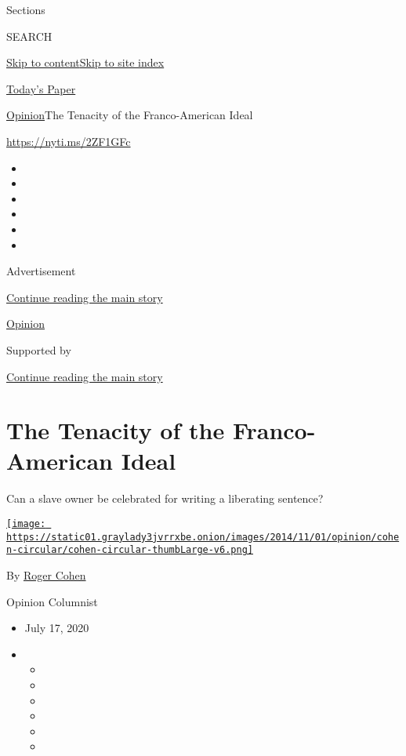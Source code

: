 Sections

SEARCH

\protect\hyperlink{site-content}{Skip to
content}\protect\hyperlink{site-index}{Skip to site index}

\href{https://myaccount.nytimes3xbfgragh.onion/auth/login?response_type=cookie\&client_id=vi}{}

\href{https://www.nytimes3xbfgragh.onion/section/todayspaper}{Today's
Paper}

\href{/section/opinion}{Opinion}\textbar{}The Tenacity of the
Franco-American Ideal

\url{https://nyti.ms/2ZF1GFc}

\begin{itemize}
\item
\item
\item
\item
\item
\item
\end{itemize}

Advertisement

\protect\hyperlink{after-top}{Continue reading the main story}

\href{/section/opinion}{Opinion}

Supported by

\protect\hyperlink{after-sponsor}{Continue reading the main story}

\hypertarget{the-tenacity-of-the-franco-american-ideal}{%
\section{The Tenacity of the Franco-American
Ideal}\label{the-tenacity-of-the-franco-american-ideal}}

Can a slave owner be celebrated for writing a liberating sentence?

\href{https://www.nytimes3xbfgragh.onion/by/roger-cohen}{\texttt{[image: https://static01.graylady3jvrrxbe.onion/images/2014/11/01/opinion/cohen-circular/cohen-circular-thumbLarge-v6.png]}}

By \href{https://www.nytimes3xbfgragh.onion/by/roger-cohen}{Roger Cohen}

Opinion Columnist

\begin{itemize}
\item
  July 17, 2020
\item
  \begin{itemize}
  \item
  \item
  \item
  \item
  \item
  \item
  \end{itemize}
\end{itemize}

